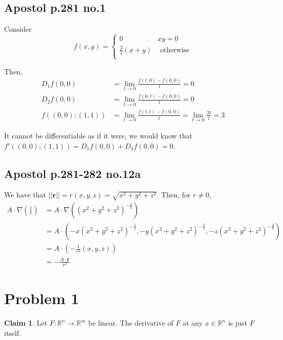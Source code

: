 \documentclass[12pt,letterpaper]{article}
\theoremstyle{definition}
\newtheorem*{claim}{Claim}
\newcommand{\R}{\mathbb{R}}
\begin{document}
\subsection*{Apostol p.281 no.1}

Consider
\[
  f(x,y) =
  \begin{cases}
    0 & xy = 0 \\
    \frac{3}{2}(x + y) &\text{ otherwise} \\
  \end{cases}
\]

Then,
\begin{align*}
  D_1f(0,0) &= \lim_{t\rightarrow 0}\frac{f(t, 0) - f(0,0)}{t} = 0 \\
  D_2f(0,0) &= \lim_{t\rightarrow 0}\frac{f(0, t) - f(0,0)}{t} = 0 \\
  f((0,0); (1,1)) &= \lim_{t\rightarrow 0}\frac{f(t,t) - f(0,0)}{t} = \lim_{t\rightarrow 0}\frac{3t}{t} = 3
\end{align*}

It cannot be differentiable as if it were, we would know that $f'((0,0); (1,1)) =
D_1f(0,0) + D_2f(0,0) = 0$.

\subsection*{Apostol p.281-282 no.12a}

We have that $||\mathbf{r}|| = r(x,y,z) = \sqrt{x^2 + y^2 + z^2}$. Then, for $r \neq 0$,
\begin{align*}
  A \cdot \nabla\left( \frac{1}{r} \right) &= A \cdot \nabla \left( (x^2 + y^2 + z^2)^{-\frac{1}{2}} \right) \\
                                           &= A \cdot \left( -x(x^2 + y^2 + z^2)^{-\frac{3}{2}}, -y(x^2 + y^2 + z^2)^{-\frac{3}{2}}, -z(x^2 + y^2 + z^2)^{-\frac{3}{2}} \right) \\
                                           &= A \cdot \left( - \frac{1}{r^3} \left( x,y,z \right)\right) \\
                                           &= -\frac{A \cdot\mathbf{r}}{r^3}
\end{align*}

\section*{Problem 1}

\begin{claim}
  Let $F: \R^n \rightarrow \R^m$ be linear. The derivative of $F$ at any $x \in \R^n$ is just $F$ itself.
\end{claim}
\end{document}
